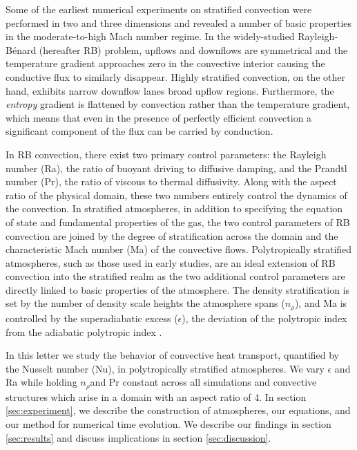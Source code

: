 \documentclass[aps, prl, twocolumn, groupedaddress, amsfonts, amssymb, amsmath]{revtex4-1}
\newcommand{\RB}{Rayleigh-B\'{e}nard }
\newcommand{\nrho}{\ensuremath{n_{\rho}}}
\begin{document}
Some of the earliest numerical experiments on stratified convection
were performed in two \cite{graham1975, chan&all1982,
hurlburt&all1984, cattaneo&all1990} and three \cite{cattaneo&all1991, brummell&all1996} dimensions and
revealed a number of basic properties in the moderate-to-high Mach number regime.
In the widely-studied \RB (hereafter RB) problem, upflows and downflows are symmetrical and
the temperature gradient approaches zero in the convective interior causing the conductive flux to similarly 
disappear.  Highly stratified convection, on the other hand, exhibits narrow downflow lanes broad upflow regions.
Furthermore, the \emph{entropy} gradient is flattened by convection rather than the temperature gradient, which
means that even in the presence of perfectly efficient convection a significant component of the flux can be
carried by conduction.

In RB convection, there exist two primary control parameters: the Rayleigh number (Ra), the ratio of
buoyant driving to diffusive damping, and the Prandtl number (Pr), the ratio of viscous to thermal
diffusivity.  Along with the aspect ratio of the physical domain, these two numbers entirely control the
dynamics of the convection.  In stratified atmospheres, in addition to specifying the equation of state and
fundamental properties of the gas, the two control parameters of RB convection are joined by the degree of
stratification across the domain and the characteristic Mach number (Ma) of the convective flows.  
Polytropically stratified atmospheres, such as those used in early studies, are an ideal extension of
RB convection into the stratified realm as the two additional control parameters are directly linked to
basic properties of the atmosphere.  The density stratification is set by the number of density scale heights
the atmosphere spans (\nrho), and Ma is controlled by the superadiabatic excess ($\epsilon$),
the deviation of the polytropic index from the adiabatic polytropic index \cite{graham1975}.

In this letter we study the behavior of convective heat transport, quantified by
the Nusselt number (Nu), in polytropically stratified atmospheres.  
We vary $\epsilon$ and Ra while holding \nrho and Pr
constant across all simulations and convective structures which arise in a domain with an aspect ratio of 4.  In section 
\ref{sec:experiment}, we describe the construction of atmospheres, our equations, and our method for
numerical time evolution.  We describe our findings in section \ref{sec:results} and discuss
implications in section \ref{sec:discussion}.
\end{document}
